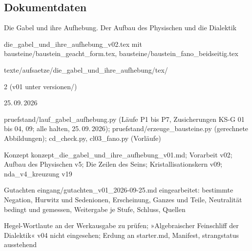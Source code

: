 \documentclass[11pt,a4paper]{article}
\begin{document}
\vfill
\sloppy
\subsection*{Dokumentdaten}
\begin{description}[itemsep=0pt,font=\normalfont\bfseries]
\item[Titel:] Die Gabel und ihre Aufhebung. Der Aufbau des Physischen und die Dialektik
\item[Datei:] die\_gabel\_und\_ihre\_aufhebung\_v02.tex mit bausteine/baustein\_geacht\_form.tex, bausteine/baustein\_fano\_beidseitig.tex
\item[Ablage:] texte/aufsaetze/die\_gabel\_und\_ihre\_aufhebung/tex/
\item[Version:] 2 (v01 unter versionen/)
\item[Datum:] 25.\,09.\,2026
\item[Prüfstand:] pruefstand/lauf\_gabel\_aufhebung.py (Läufe P1 bis P7, Zusicherungen KS-G 01 bis 04, 09; alle halten, 25.\,09.\,2026); pruefstand/erzeuge\_bausteine.py (gerechnete Abbildungen); cd\_check.py, cl03\_fano.py (Vorläufe)
\item[Grundlage:] Konzept konzept\_die\_gabel\_und\_ihre\_aufhebung\_v01.md; Vorarbeit v02; Aufbau des Physischen v5; Die Zeilen des Seins; Kristallisationskern v09; nda\_v4\_kreuzung v19
\item[Änderung v2:] Gutachten eingang/gutachten\_v01\_2026-09-25.md eingearbeitet: bestimmte Negation, Hurwitz und Sedenionen, Erscheinung, Ganzes und Teile, Neutralität bedingt und gemessen, Weitergabe je Stufe, Schluss, Quellen
\item[Offen:] Hegel-Wortlaute an der Werkausgabe zu prüfen; »Algebraischer Feinschliff der Dialektik« v04 nicht eingesehen; Erdung an starter.md, Manifest, strangstatus ausstehend
\end{description}
\end{document}
